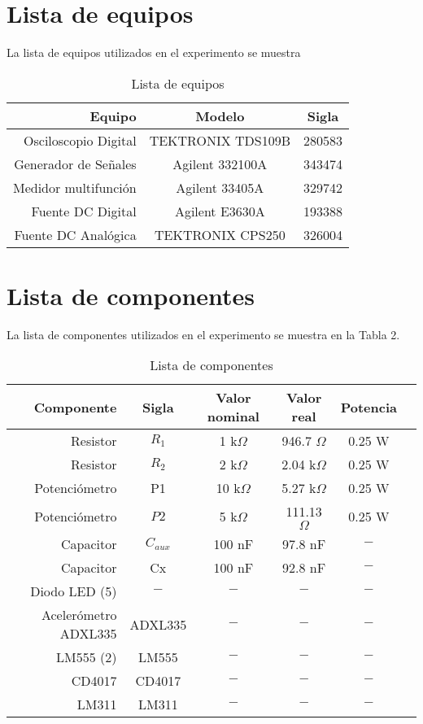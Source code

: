 \section{Lista de equipos}

La lista de equipos utilizados en el experimento se muestra 
\begin{table}[!ht]
\caption{Lista de equipos}
\label{t2}
\begin{center}
\begin{tabular}{r|cc}
\hline
\textbf{Equipo}&\textbf{Modelo}&\textbf{Sigla}\\
 \hline
 Osciloscopio Digital&TEKTRONIX TDS109B&280583\\
 Generador de Señales&Agilent 332100A&343474\\
 Medidor multifunción&Agilent 33405A&329742\\
 Fuente DC Digital&Agilent E3630A&193388\\ 
 Fuente DC Analógica&TEKTRONIX CPS250&326004\\
 \hline
\end{tabular}
\end{center}
\end{table}

\newpage
\section{Lista de componentes}

La lista de componentes utilizados en el experimento se muestra en la Tabla 2.
\begin{table*} [!ht]
\caption{Lista de componentes}
\label{t3}
\begin{center}
\begin{tabular}{r|ccccc}
\hline
\textbf{Componente} & \textbf{Sigla} & \textbf{Valor nominal} & \textbf{Valor real}& \textbf{Potencia}\\ 
\hline
Resistor  & $R_1$ & 1 k$\Omega$ &946.7 $\Omega$ & 0.25 W\\  
Resistor  & $R_2$ & 2 k$\Omega$ & 2.04 k$\Omega$  & 0.25 W\\  
Potenciómetro  & P1 & 10 k$\Omega$  & 5.27 k$\Omega$ & 0.25 W\\  
Potenciómetro  & $P2$ & 5 k$\Omega$  & 111.13  $\Omega$ & 0.25 W\\  
Capacitor &$C_{aux}$& 100 nF &97.8 nF& $-$\\ 
Capacitor &Cx& 100 nF &92.8 nF& $-$\\ 
Diodo LED (5) &$-$ &$-$ &$-$ & $-$\\ 
Acelerómetro ADXL335& ADXL335&$-$ &$-$ & $-$\\ 
LM555 (2)  & LM555 &$-$ &$-$ & $-$\\  
CD4017   & CD4017 &$-$ &$-$ & $-$\\   
LM311   & LM311 &$-$ &$-$ & $-$\\  


\hline
\end{tabular}
\end{center}
\end{table*}


\newpage